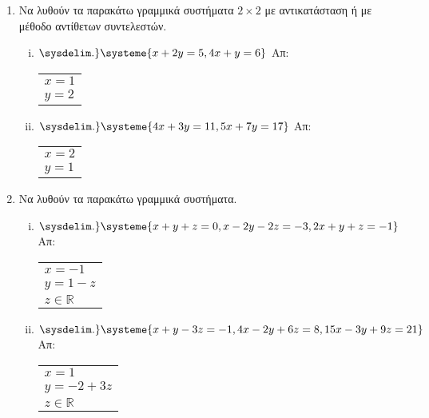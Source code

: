 


\usepackage{systeme}

\pagestyle{askhseis}


\setlength{\itemsep}{\baselineskip}


\begin{center}
  \minibox{\large \bfseries \textcolor{Col1}{Ασκήσεις στα Γραμμικά Συστήματα}}
\end{center}

\vspace{\baselineskip}

\begin{enumerate}

  \item Να λυθούν τα παρακάτω γραμμικά συστήματα $ 2 \times 2 $ με αντικατάσταση ή με 
    μέθοδο αντίθετων συντελεστών.

    \begin{enumerate}[i)]
      \item $ 
      \sysdelim.\}
      \systeme{
        x + 2y = 5, 
        4x + y = 6
      } $ 
      \hfill Απ: 
      \begin{tabular}{l}  
        $x=1 $ \\ 
        $y=2 $ 
      \end{tabular}

    \item $ 
    \sysdelim.\}
    \systeme{
      4x+3y=11,
      5x+7y=17
    } $ 
    \hfill Απ: 
    \begin{tabular}{l}  
      $x=2 $ \\ 
      $y=1 $ 
    \end{tabular}
\end{enumerate}

  \item Να λυθούν τα παρακάτω γραμμικά συστήματα.

    \begin{enumerate}[i)]
      \item $ 
      \sysdelim.\}
      \systeme{
        x+y+z=0,
        x-2y-2z=-3,
        2x+y+z=-1
      } $ 
      \hfill Απ: \begin{tabular}{l}  
        $x=-1 $ \\ 
        $ y=1-z $ \\
        $z \in \mathbb{R}  $
      \end{tabular}

    \item $ 
    \sysdelim.\}
    \systeme{
      x+y-3z=-1,
      4x-2y+6z=8,
      15x-3y+9z=21
    } $ 
    \hfill Απ: \begin{tabular}{l}  
      $x=1 $ \\ 
      $ y=-2+3z $ \\
      $z \in \mathbb{R}  $
    \end{tabular}


\end{enumerate}
\end{enumerate}
